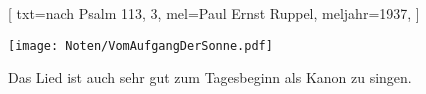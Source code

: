 [
    txt={nach Psalm 113, 3}, 
    mel={Paul Ernst Ruppel}, 
    meljahr={1937},
    ]

\beginverse
\endverse
\centering\texttt{[image: Noten/VomAufgangDerSonne.pdf]}

\endsong

\beginscripture{}
Das Lied ist auch sehr gut zum Tagesbeginn als Kanon zu singen.
\endscripture

